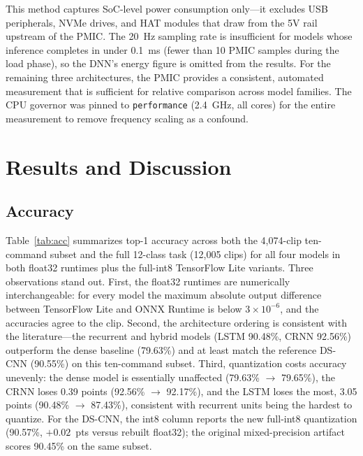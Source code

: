 \documentclass[conference,a4paper]{IEEEtran}
\begin{document}
This method captures SoC-level power consumption only---it excludes USB peripherals, NVMe drives, and HAT modules that draw from the 5V rail upstream of the PMIC. The 20~Hz sampling rate is insufficient for models whose inference completes in under 0.1~ms (fewer than 10 PMIC samples during the load phase), so the DNN's energy figure is omitted from the results. For the remaining three architectures, the PMIC provides a consistent, automated measurement that is sufficient for relative comparison across model families. The CPU governor was pinned to \texttt{performance} (2.4~GHz, all cores) for the entire measurement to remove frequency scaling as a confound.

\section{Results and Discussion}

\subsection{Accuracy}

Table~\ref{tab:acc} summarizes top-1 accuracy across both the 4{,}074-clip ten-command subset and the full 12-class task (12{,}005 clips) for all four models in both float32 runtimes plus the full-int8 TensorFlow Lite variants. Three observations stand out. First, the float32 runtimes are numerically interchangeable: for every model the maximum absolute output difference between TensorFlow Lite and ONNX Runtime is below $3\times10^{-6}$, and the accuracies agree to the clip. Second, the architecture ordering is consistent with the literature---the recurrent and hybrid models (LSTM 90.48\%, CRNN 92.56\%) outperform the dense baseline (79.63\%) and at least match the reference DS-CNN (90.55\%) on this ten-command subset. Third, quantization costs accuracy unevenly: the dense model is essentially unaffected (79.63\% $\rightarrow$ 79.65\%), the CRNN loses 0.39 points (92.56\% $\rightarrow$ 92.17\%), and the LSTM loses the most, 3.05 points (90.48\% $\rightarrow$ 87.43\%), consistent with recurrent units being the hardest to quantize. For the DS-CNN, the int8 column reports the new full-int8 quantization (90.57\%, $+0.02$~pts versus rebuilt float32); the original mixed-precision artifact scores 90.45\% on the same subset.
\end{document}
